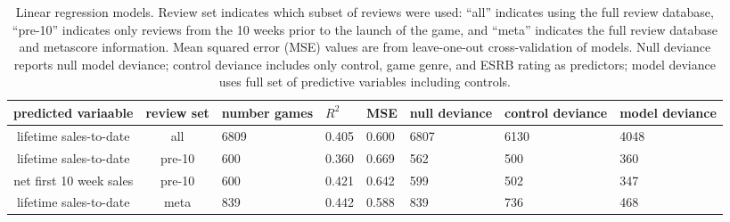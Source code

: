 \documentclass[letterpaper]{article}
\begin{document}
\begin{table}[tb]
\centering
\scriptsize
\begin{tabularx}{\linewidth}{|c|c|X|X|X|X|X|X|}
\hline\textbf{ predicted variaable} & \textbf{review set} & \textbf{number games} & $R^2$ & MSE & null deviance & control deviance & model deviance \\ 
\hline lifetime sales-to-date & all & 6809 & 0.405 & 0.600 & 6807 & 6130 & 4048\\ 
\hline lifetime sales-to-date & pre-10 & 600 & 0.360 & 0.669 & 562 & 500 & 360\\ 
\hline net first 10 week sales & pre-10 & 600 & 0.421 & 0.642 & 599 & 502 & 347\\ 
\hline lifetime sales-to-date & meta & 839 & 0.442 & 0.588 & 839 & 736 & 468\\ 
\hline 
\end{tabularx}
\caption{Linear regression models. Review set indicates which subset of reviews were used: ``all'' indicates using the full review database, ``pre-10'' indicates only reviews from the 10 weeks prior to the launch of the game, and ``meta'' indicates the full review database and metascore information. Mean squared error (MSE) values are from leave-one-out cross-validation of models. Null deviance reports null model deviance; control deviance includes only control, game genre, and ESRB rating as predictors; model deviance uses full set of predictive variables including controls.}
\label{tab:regression_models}
\end{table}
\end{document}
